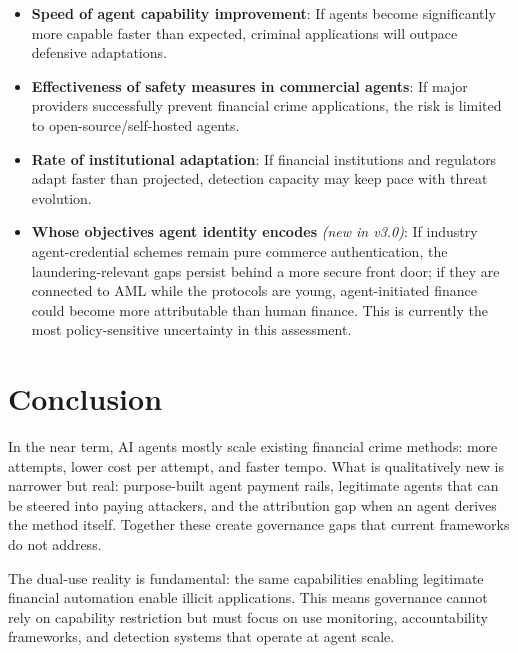 \documentclass[11pt,letterpaper]{article}
\begin{document}
\begin{itemize}
  \item \textbf{Speed of agent capability improvement}: If agents become significantly more capable faster than expected, criminal applications will outpace defensive adaptations.
  \item \textbf{Effectiveness of safety measures in commercial agents}: If major providers successfully prevent financial crime applications, the risk is limited to open-source/self-hosted agents.
  \item \textbf{Rate of institutional adaptation}: If financial institutions and regulators adapt faster than projected, detection capacity may keep pace with threat evolution.
  \item \textbf{Whose objectives agent identity encodes} \textit{(new in v3.0)}: If industry agent-credential schemes remain pure commerce authentication, the laundering-relevant gaps persist behind a more secure front door; if they are connected to AML while the protocols are young, agent-initiated finance could become more attributable than human finance. This is currently the most policy-sensitive uncertainty in this assessment.
\end{itemize}

\section{Conclusion}

In the near term, AI agents mostly scale existing financial crime methods: more attempts, lower cost per attempt, and faster tempo. What is qualitatively new is narrower but real: purpose-built agent payment rails, legitimate agents that can be steered into paying attackers, and the attribution gap when an agent derives the method itself. Together these create governance gaps that current frameworks do not address.

The dual-use reality is fundamental: the same capabilities enabling legitimate financial automation enable illicit applications. This means governance cannot rely on capability restriction but must focus on use monitoring, accountability frameworks, and detection systems that operate at agent scale.
\end{document}
